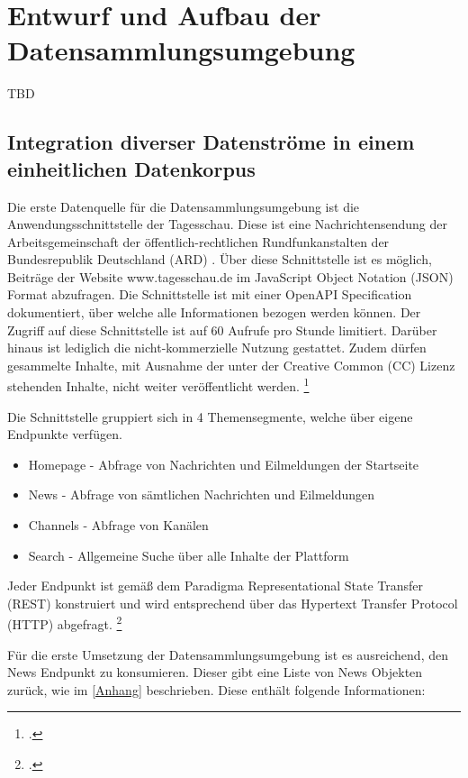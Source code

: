 \newpage
\section{Entwurf und Aufbau der Datensammlungsumgebung}
TBD

\subsection{Integration diverser Datenströme in einem einheitlichen Datenkorpus}
Die erste Datenquelle für die Datensammlungsumgebung ist die Anwendungsschnittstelle der Tagesschau. Diese ist eine Nachrichtensendung der Arbeitsgemeinschaft der öffentlich-rechtlichen Rundfunkanstalten der Bundesrepublik Deutschland (ARD) . Über diese Schnittstelle ist es möglich, Beiträge der Website www.tagesschau.de im JavaScript Object Notation (JSON) Format abzufragen. 
Die Schnittstelle ist mit einer OpenAPI Specification dokumentiert, über welche alle Informationen bezogen werden können. Der Zugriff auf diese Schnittstelle ist auf 60 Aufrufe pro Stunde limitiert. Darüber hinaus ist lediglich die nicht-kommerzielle Nutzung gestattet. Zudem dürfen gesammelte Inhalte, mit Ausnahme der unter der Creative Common (CC) Lizenz stehenden Inhalte, nicht weiter veröffentlicht werden. \footcite [Vgl.][]{Fischer.2024}

Die Schnittstelle gruppiert sich in 4 Themensegmente, welche über eigene Endpunkte verfügen. 
\begin{itemize}
    \item Homepage - Abfrage von Nachrichten und Eilmeldungen der Startseite
    \item News - Abfrage von sämtlichen Nachrichten und Eilmeldungen
    \item Channels - Abfrage von Kanälen
    \item Search - Allgemeine Suche über alle Inhalte der Plattform
\end{itemize}
Jeder Endpunkt ist gemäß dem Paradigma Representational State Transfer (REST) konstruiert und wird entsprechend über das Hypertext Transfer Protocol (HTTP) abgefragt. \footcite [Vgl.][]{Fischer.2024}

Für die erste Umsetzung der Datensammlungsumgebung ist es ausreichend, den News Endpunkt zu konsumieren. Dieser gibt eine Liste von News Objekten zurück, wie im \ref{Anhang} beschrieben. Diese enthält folgende Informationen:


